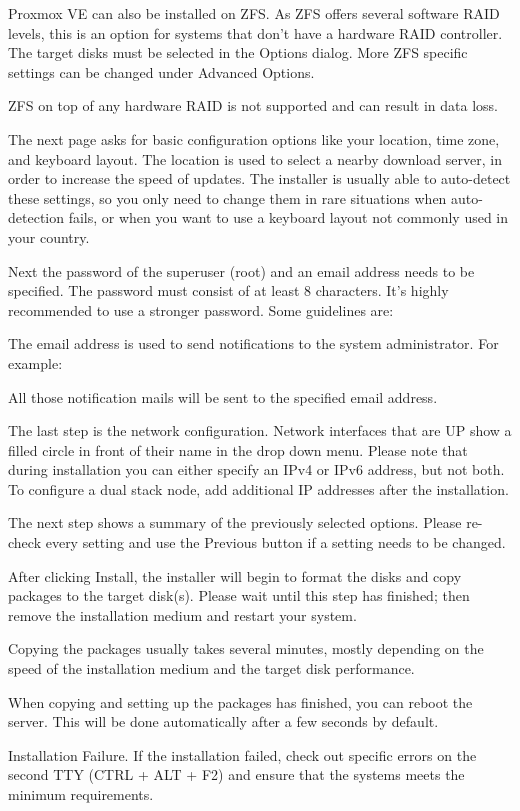 Proxmox VE can also be installed on ZFS. As ZFS offers several software RAID levels, this is an option for systems that don’t have a hardware RAID controller. The target disks must be selected in the Options dialog. More ZFS specific settings can be changed under Advanced Options.

ZFS on top of any hardware RAID is not supported and can result in data loss.

The next page asks for basic configuration options like your location, time zone, and keyboard layout. The location is used to select a nearby download server, in order to increase the speed of updates. The installer is usually able to auto-detect these settings, so you only need to change them in rare situations when auto-detection fails, or when you want to use a keyboard layout not commonly used in your country.

Next the password of the superuser (root) and an email address needs to be specified. The password must consist of at least 8 characters. It’s highly recommended to use a stronger password. Some guidelines are:

The email address is used to send notifications to the system administrator. For example:

All those notification mails will be sent to the specified email address.

The last step is the network configuration. Network interfaces that are UP show a filled circle in front of their name in the drop down menu. Please note that during installation you can either specify an IPv4 or IPv6 address, but not both. To configure a dual stack node, add additional IP addresses after the installation.

The next step shows a summary of the previously selected options. Please re-check every setting and use the Previous button if a setting needs to be changed.

After clicking Install, the installer will begin to format the disks and copy packages to the target disk(s). Please wait until this step has finished; then remove the installation medium and restart your system.

Copying the packages usually takes several minutes, mostly depending on the speed of the installation medium and the target disk performance.

When copying and setting up the packages has finished, you can reboot the server. This will be done automatically after a few seconds by default.

Installation Failure. If the installation failed, check out specific errors on the second TTY (CTRL + ALT + F2) and ensure that the systems meets the minimum requirements.

